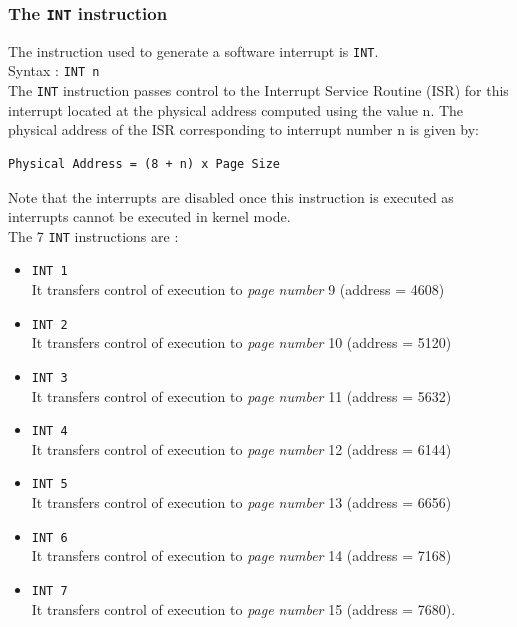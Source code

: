 \documentclass[11pt]{report}
\begin{document}
\subsubsection{The \texttt{INT} instruction}
The instruction used to generate a software interrupt is \texttt{INT}.\\
Syntax : \texttt{INT n}\\
The \texttt{INT} instruction passes control to the Interrupt Service Routine (ISR) for this interrupt located at the physical address computed using the value n. The physical address of the ISR corresponding to interrupt number n is given by: 
\begin{verbatim}
Physical Address = (8 + n) x Page Size
\end{verbatim}
Note that the interrupts are disabled once this instruction is executed as interrupts cannot be executed in kernel mode.\\

The 7 \texttt{INT} instructions are :
\begin{itemize}

\item \texttt{INT 1}  \\It transfers control of execution to \textit{page number} 9 (address = 4608)
\item \texttt{INT 2}  \\It transfers control of execution to \textit{page number} 10 (address = 5120)  
\item \texttt{INT 3}  \\It transfers control of execution to \textit{page number} 11 (address = 5632)
\item \texttt{INT 4}  \\It transfers control of execution to \textit{page number}  12 (address = 6144) 
\item \texttt{INT 5}  \\It transfers control of execution to \textit{page number} 13 (address = 6656)
\item \texttt{INT 6}  \\It transfers control of execution to \textit{page number} 14 (address = 7168)
\item \texttt{INT 7}  \\It transfers control of execution to \textit{page number} 15 (address = 7680).\
 
\end{itemize}
\end{document}
